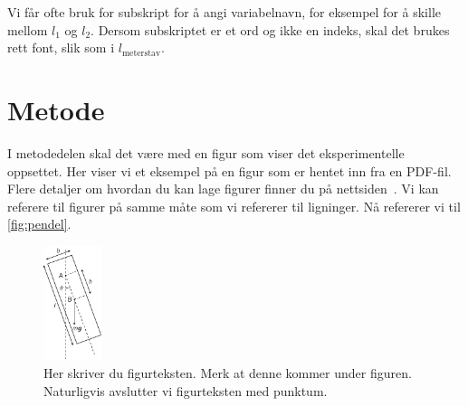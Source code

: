 Vi får ofte bruk for subskript for å angi variabelnavn, for eksempel for å skille mellom $l_1$ og $l_2$. Dersom subskriptet er et ord og ikke en indeks, skal det brukes rett font, slik som i $l_\text{meterstav}$.



\section{Metode}
I metodedelen skal det være med en figur som viser det eksperimentelle oppsettet. Her viser vi et eksempel på en figur som er hentet inn fra en PDF-fil. Flere detaljer om hvordan du kan lage figurer finner du på nettsiden~\cite{labside}. Vi kan referere til figurer på samme måte som vi refererer til ligninger. Nå refererer vi til \autoref{fig:pendel}.

\begin{figure}[tbp] 
\centering %
\includegraphics[width=0.15\textwidth]{pendel-oppdatert.pdf}
\caption{Her skriver du figurteksten. Merk at denne kommer under figuren. Naturligvis avslutter vi figurteksten med punktum.}
\label{fig:pendel} %
\end{figure}

